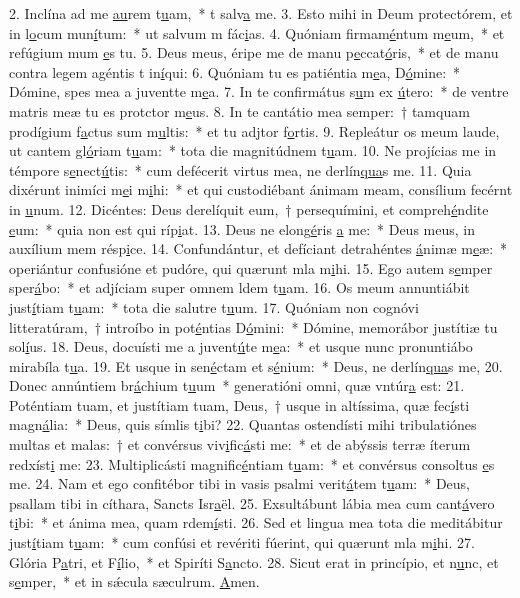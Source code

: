 2. Inclína ad me \uline{au}rem t\uline{u}am,~* t salv\uline{a} me.
3. Esto mihi in Deum protectórem, et in l\uline{o}cum mun\uline{í}tum:~* ut salvum m fác\uline{i}as.
4. Quóniam firmam\uline{é}ntum m\uline{e}um,~* et refúgium mum \uline{e}s tu.
5. Deus meus, éripe me de manu p\uline{e}ccat\uline{ó}ris,~* et de manu contra legem agéntis t in\uline{í}qui:
6. Quóniam tu es patiéntia m\uline{e}a, D\uline{ó}mine:~* Dómine, spes mea a juventte m\uline{e}a.
7. In te confirmátus s\uline{u}m ex \uline{ú}tero:~* de ventre matris meæ tu es protctor m\uline{e}us.
8. In te cantátio mea semper:~† tamquam prodígium f\uline{a}ctus sum m\uline{u}ltis:~* et tu adjtor f\uline{o}rtis.
9. Repleátur os meum laude, ut cantem gl\uline{ó}riam t\uline{u}am:~* tota die magnitúdnem t\uline{u}am.
10. Ne projícias me in témpore s\uline{e}nect\uline{ú}tis:~* cum defécerit virtus mea, ne derlín\uline{qua}s me.
11. Quia dixérunt inimíci m\uline{e}i m\uline{i}hi:~* et qui custodiébant ánimam meam, consílium fecérnt in \uline{u}num.
12. Dicéntes: Deus derelíquit eum,~† persequímini, et compreh\uline{é}ndite \uline{e}um:~* quia non est qui ríp\uline{i}at.
13. Deus ne elong\uline{é}ris \uline{a} me:~* Deus meus, in auxílium mem résp\uline{i}ce.
14. Confundántur, et defíciant detrahéntes \uline{á}nimæ m\uline{e}æ:~* operiántur confusióne et pudóre, qui quærunt mla m\uline{i}hi.
15. Ego autem s\uline{e}mper sper\uline{á}bo:~* et adjíciam super omnem ldem t\uline{u}am.
16. Os meum annuntiábit just\uline{í}tiam t\uline{u}am:~* tota die salutre t\uline{u}um.
17. Quóniam non cognóvi litteratúram,~† introíbo in pot\uline{é}ntias D\uline{ó}mini:~* Dómine, memorábor justítiæ tu sol\uline{í}us.
18. Deus, docuísti me a juvent\uline{ú}te m\uline{e}a:~* et usque nunc pronuntiábo mirabíla t\uline{u}a.
19. Et usque in sen\uline{é}ctam et s\uline{é}nium:~* Deus, ne derlín\uline{qua}s me,
20. Donec annúntiem br\uline{á}chium t\uline{u}um~* generatióni omni, quæ vntúr\uline{a} est:
21. Poténtiam tuam, et justítiam tuam, Deus,~† usque in altíssima, quæ fec\uline{í}sti magn\uline{á}lia:~* Deus, quis símlis t\uline{i}bi?
22. Quantas ostendísti mihi tribulatiónes multas et malas:~† et convérsus viv\uline{i}fic\uline{á}sti me:~* et de abýssis terræ íterum redxíst\uline{i} me:
23. Multiplicásti magnific\uline{é}ntiam t\uline{u}am:~* et convérsus consoltus \uline{e}s me.
24. Nam et ego confitébor tibi in vasis psalmi verit\uline{á}tem t\uline{u}am:~* Deus, psallam tibi in cíthara, Sancts Isr\uline{a}ël.
25. Exsultábunt lábia mea cum cant\uline{á}vero t\uline{i}bi:~* et ánima mea, quam rdem\uline{í}sti.
26. Sed et lingua mea tota die meditábitur just\uline{í}tiam t\uline{u}am:~* cum confúsi et revériti fúerint, qui quærunt mla m\uline{i}hi.
27. Glória P\uline{a}tri, et F\uline{í}lio,~* et Spiríti S\uline{a}ncto.
28. Sicut erat in princípio, et n\uline{u}nc, et s\uline{e}mper,~* et in sǽcula sæculrum. \uline{A}men.
